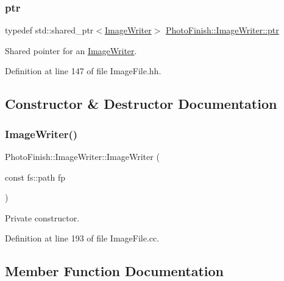 \subsubsection{\texorpdfstring{ptr}{ptr}}
{\footnotesize\ttfamily typedef std\+::shared\+\_\+ptr$<$\hyperlink{class_photo_finish_1_1_image_writer}{Image\+Writer}$>$ \hyperlink{class_photo_finish_1_1_image_writer_ad09511cf9f26b7cec2ca0fb6ae361aac}{Photo\+Finish\+::\+Image\+Writer\+::ptr}}



Shared pointer for an \hyperlink{class_photo_finish_1_1_image_writer}{Image\+Writer}. 



Definition at line 147 of file Image\+File.\+hh.



\subsection{Constructor \& Destructor Documentation}
\mbox{\label{class_photo_finish_1_1_image_writer_aa20f3f269819030b312ffd2a48591bb0}} 
\subsubsection{\texorpdfstring{Image\+Writer()}{ImageWriter()}}
{\footnotesize\ttfamily Photo\+Finish\+::\+Image\+Writer\+::\+Image\+Writer (\begin{DoxyParamCaption}\item[{const fs\+::path}]{fp }\end{DoxyParamCaption})\hspace{0.3cm}{\ttfamily [protected]}}



Private constructor. 



Definition at line 193 of file Image\+File.\+cc.



\subsection{Member Function Documentation}
\mbox{\label{class_photo_finish_1_1_image_writer_aabd983d34a04798323685e2514ff532d}} 
